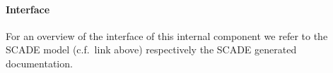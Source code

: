 \paragraph{Interface}

For an overview of the interface of this internal component we refer to the SCADE model (c.f.~link above) respectively the SCADE generated documentation.

%
%
%
%
%
